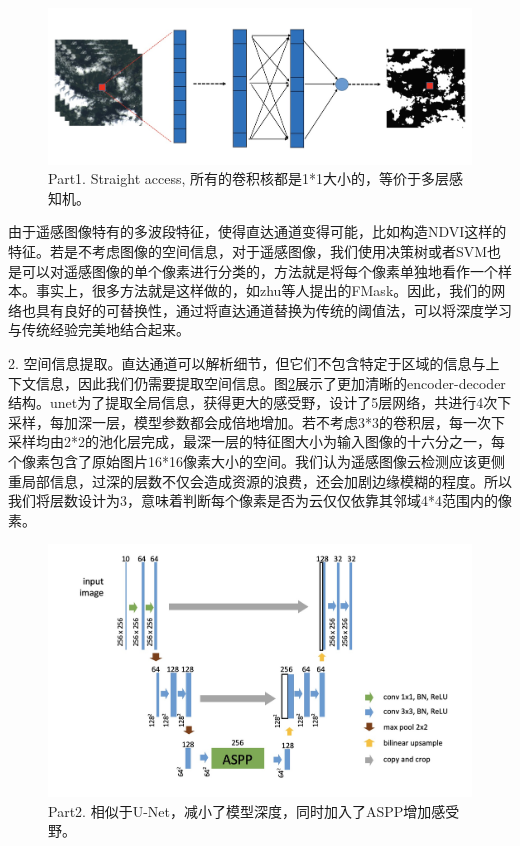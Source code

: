 \documentclass[UTF8]{ctexart}
\begin{document}
\begin{figure}[H]
    \centering
    \includegraphics[scale=0.25]{../pic/part1.jpg}
    \caption[]{Part1. Straight access, 所有的卷积核都是1*1大小的，等价于多层感知机。}
    \label{pic:straight}
\end{figure}

由于遥感图像特有的多波段特征，使得直达通道变得可能，比如构造NDVI这样的特征。若是不考虑图像的空间信息，对于遥感图像，我们使用决策树或者SVM也是可以对遥感图像的单个像素进行分类的，方法就是将每个像素单独地看作一个样本。事实上，很多方法就是这样做的，如zhu等人提出的FMask\cite{zhu2012object}。因此，我们的网络也具有良好的可替换性，通过将直达通道替换为传统的阈值法，可以将深度学习与传统经验完美地结合起来。

2. 空间信息提取。直达通道可以解析细节，但它们不包含特定于区域的信息与上下文信息，因此我们仍需要提取空间信息。图\ref{pic:part2}展示了更加清晰的encoder-decoder结构。unet为了提取全局信息，获得更大的感受野，设计了5层网络，共进行4次下采样，每加深一层，模型参数都会成倍地增加。若不考虑3*3的卷积层，每一次下采样均由2*2的池化层完成，最深一层的特征图大小为输入图像的十六分之一，每个像素包含了原始图片16*16像素大小的空间。我们认为遥感图像云检测应该更侧重局部信息，过深的层数不仅会造成资源的浪费，还会加剧边缘模糊的程度。所以我们将层数设计为3，意味着判断每个像素是否为云仅仅依靠其邻域4*4范围内的像素。

\begin{figure}[H]
    \centering
    \includegraphics[scale=0.25]{../pic/part2.jpg}
    \caption[]{Part2. 相似于U-Net，减小了模型深度，同时加入了ASPP增加感受野。}
    \label{pic:part2}
\end{figure}
\end{document}
